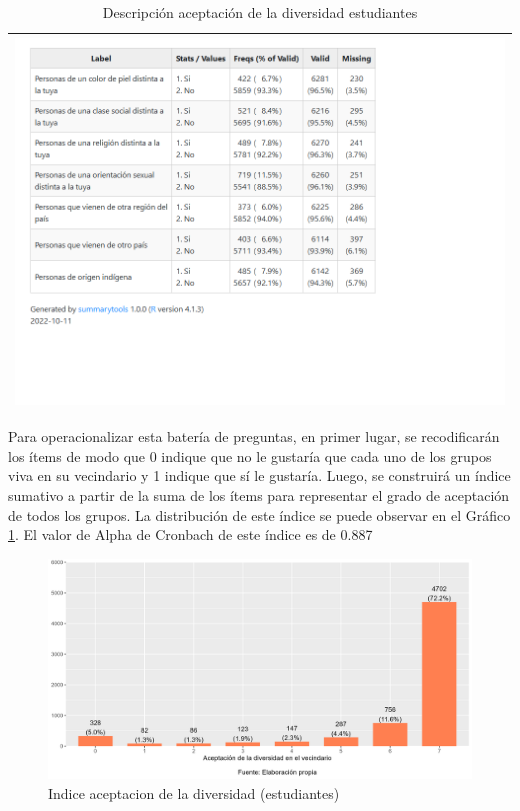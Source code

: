\documentclass[12pt,twoside]{templates/facsothesis}
\begin{document}
\begin{longtable}[]{@{}l@{}}
\caption{\label{tab:desc01}Descripción aceptación de la diversidad estudiantes}\tabularnewline
\toprule()
\endhead
\includegraphics{IPO/output/tables/desc01.png} \\
\bottomrule()
\end{longtable}

Para operacionalizar esta batería de preguntas, en primer lugar, se recodificarán los ítems de modo que 0 indique que no le gustaría que cada uno de los grupos viva en su vecindario y 1 indique que sí le gustaría. Luego, se construirá un índice sumativo a partir de la suma de los ítems para representar el grado de aceptación de todos los grupos. La distribución de este índice se puede observar en el Gráfico \ref{fig:ind-est}. El valor de Alpha de Cronbach de este índice es de 0.887

\begin{figure}[!ht]

{\centering \includegraphics[width=0.8\linewidth,]{IPO/output/graphs/ind_est} 

}

\caption{Indice aceptacion de la diversidad (estudiantes)}\label{fig:ind-est}
\end{figure}
\end{document}
